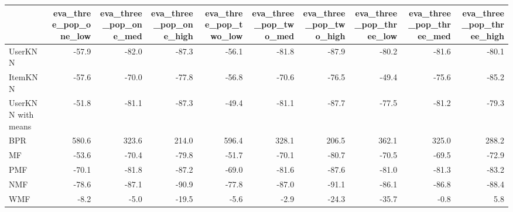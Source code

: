 \begin{tabular}{lrrrrrrrrr}
\toprule
{} &  eva\_three\_pop\_one\_low &  eva\_three\_pop\_one\_med &  eva\_three\_pop\_one\_high &  eva\_three\_pop\_two\_low &  eva\_three\_pop\_two\_med &  eva\_three\_pop\_two\_high &  eva\_three\_pop\_three\_low &  eva\_three\_pop\_three\_med &  eva\_three\_pop\_three\_high \\
\midrule
UserKNN            &                  -57.9 &                  -82.0 &                   -87.3 &                  -56.1 &                  -81.8 &                   -87.9 &                    -80.2 &                    -81.6 &                     -80.1 \\
ItemKNN            &                  -57.6 &                  -70.0 &                   -77.8 &                  -56.8 &                  -70.6 &                   -76.5 &                    -49.4 &                    -75.6 &                     -85.2 \\
UserKNN with means &                  -51.8 &                  -81.1 &                   -87.3 &                  -49.4 &                  -81.1 &                   -87.7 &                    -77.5 &                    -81.2 &                     -79.3 \\
BPR                &                  580.6 &                  323.6 &                   214.0 &                  596.4 &                  328.1 &                   206.5 &                    362.1 &                    325.0 &                     288.2 \\
MF                 &                  -53.6 &                  -70.4 &                   -79.8 &                  -51.7 &                  -70.1 &                   -80.7 &                    -70.5 &                    -69.5 &                     -72.9 \\
PMF                &                  -70.1 &                  -81.8 &                   -87.2 &                  -69.0 &                  -81.6 &                   -87.6 &                    -81.0 &                    -81.3 &                     -83.2 \\
NMF                &                  -78.6 &                  -87.1 &                   -90.9 &                  -77.8 &                  -87.0 &                   -91.1 &                    -86.1 &                    -86.8 &                     -88.4 \\
WMF                &                   -8.2 &                   -5.0 &                   -19.5 &                   -5.6 &                   -2.9 &                   -24.3 &                    -35.7 &                     -0.8 &                       5.8 \\

\end{tabular}
